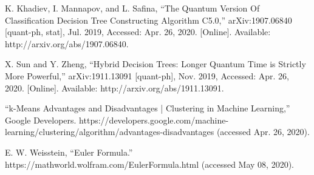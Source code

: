 \documentclass[conference]{IEEEtran}
\begin{document}
\begin{thebibliography}{00}
 K. Khadiev, I. Mannapov, and L. Safina, “The Quantum Version Of Classification Decision Tree Constructing Algorithm C5.0,” arXiv:1907.06840 [quant-ph, stat], Jul. 2019, Accessed: Apr. 26, 2020. [Online]. Available: http://arxiv.org/abs/1907.06840.

 X. Sun and Y. Zheng, “Hybrid Decision Trees: Longer Quantum Time is Strictly More Powerful,” arXiv:1911.13091 [quant-ph], Nov. 2019, Accessed: Apr. 26, 2020. [Online]. Available: http://arxiv.org/abs/1911.13091.

 “k-Means Advantages and Disadvantages | Clustering in Machine Learning,” Google Developers. https://developers.google.com/machine-learning/clustering/algorithm/advantages-disadvantages (accessed Apr. 26, 2020).

E. W. Weisstein, “Euler Formula.” https://mathworld.wolfram.com/EulerFormula.html (accessed May 08, 2020).




\end{thebibliography}
\end{document}
